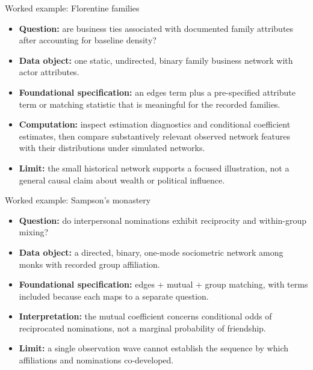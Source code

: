 \documentclass[aspectratio=169,11pt]{beamer}
\newcommand{\term}[1]{\textbf{\color{nupurple}#1}}
\begin{document}
\begin{frame}{Worked example: Florentine families}
\begin{itemize}
\item \term{Question:} are business ties associated with documented family attributes after accounting for baseline density?
\item \term{Data object:} one static, undirected, binary family business network with actor attributes.
\item \term{Foundational specification:} an edges term plus a pre-specified attribute term or matching statistic that is meaningful for the recorded families.
\item \term{Computation:} inspect estimation diagnostics and conditional coefficient estimates, then compare substantively relevant observed network features with their distributions under simulated networks.
\item \term{Limit:} the small historical network supports a focused illustration, not a general causal claim about wealth or political influence.
\end{itemize}
\end{frame}

\begin{frame}{Worked example: Sampson's monastery}
\begin{itemize}
\item \term{Question:} do interpersonal nominations exhibit reciprocity and within-group mixing?
\item \term{Data object:} a directed, binary, one-mode sociometric network among monks with recorded group affiliation.
\item \term{Foundational specification:} edges + mutual + group matching, with terms included because each maps to a separate question.
\item \term{Interpretation:} the mutual coefficient concerns conditional odds of reciprocated nominations, not a marginal probability of friendship.
\item \term{Limit:} a single observation wave cannot establish the sequence by which affiliations and nominations co-developed.
\end{itemize}
\end{frame}
\end{document}
